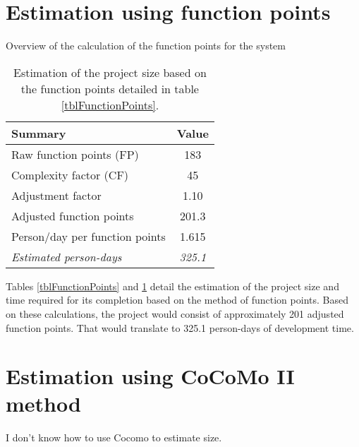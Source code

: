 \section{Estimation using function points}

\begin{table}[hbtp]
\centering

\caption{Overview of the calculation of the function points for the system}
\label{tblFunctionPoints}
\end{table}

\begin{table}[hbtp]
\centering
\begin{tabular}{l|c}
\textbf{Summary} & \textbf{Value} \\ \hline
Raw function points (FP) & 183 \\
Complexity factor (CF) & 45 \\
Adjustment factor & 1.10 \\
Adjusted function points & 201.3 \\
Person/day per function points & 1.615 \\ \hline
\textit{Estimated person-days} & \textit{325.1}
\end{tabular}
\caption{Estimation of the project size based on the function points detailed in table \ref{tblFunctionPoints}.}
\label{tblFPEstimate}
\end{table}

Tables \ref{tblFunctionPoints} and \ref{tblFPEstimate} detail the estimation of the project size and time required for its completion based on the method of function points. Based on these calculations, the project would consist of approximately 201 adjusted function points. That would translate to 325.1 person-days of development time.

\section{Estimation using CoCoMo II method}

I don't know how to use Cocomo to estimate size.

